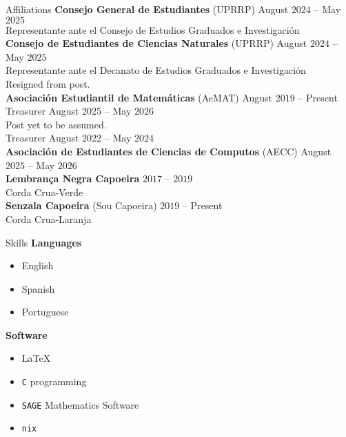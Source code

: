 \documentclass{resume}
\begin{document}
\begin{rSection}{Affiliations}
  \textbf{Consejo General de Estudiantes} (UPRRP)
            \hfill August $2024$ -- May $2025$  \\
  Representante ante el Consejo de Estudios Graduados e
  Investigaci\'on \\

  \textbf{Consejo de Estudiantes de Ciencias Naturales} (UPRRP)
            \hfill August $2024$ -- May $2025$  \\
  Representante ante el Decanato de Estudios Graduados e
  Investigaci\'on \\
  {\footnotesize Resigned from post}.  \\

  \textbf{Asociaci\'on Estudiantil de Matem\'aticas} (AeMAT)
            \hfill August $2019$ -- Present \\
    Treasurer \hfill August $2025$ -- May $2026$ \\
    {\footnotesize Post yet to be assumed}.  \medskip \\
    Treasurer \hfill August $2022$ -- May $2024$ \\

  \textbf{Asociaci\'on de Estudiantes de Ciencias de Computos} (AECC)
            \hfill August $2025$ -- May  $2026$ \\

  \textbf{Lembran\c{c}a Negra Capoeira} \hfill $2017$ -- $2019$ \\
  Corda Crua-Verde  \\

  \textbf{Senzala Capoeira} (Sou Capoeira) \hfill $2019$ -- Present \\
  Corda Crua-Laranja  \\
\end{rSection}

\begin{rSection}{Skills}
  \textbf{Languages}
  \begin{itemize}
    \item[] English

    \item[] Spanish

    \item[] Portuguese
  \end{itemize}

  \textbf{Software}
  \begin{itemize}
    \item[] \LaTeX

    \item[] \lstinline{C} programming

    \item[] \lstinline{SAGE} Mathematics Software

    \item[] \lstinline{nix}
  \end{itemize}
\end{rSection}
\end{document}
